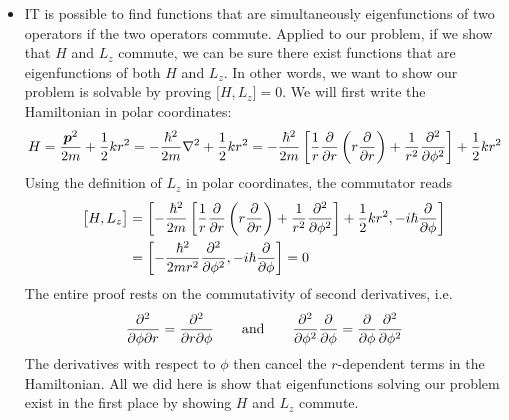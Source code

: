 \documentclass[11pt, a4paper]{article}
\newcommand{\eqtext}[1]{\qquad \text{#1} \qquad}
\renewcommand{\vec}[1]{\bm{#1}} %
\begin{document}
\begin{itemize}
	\item IT is possible to find functions that are simultaneously eigenfunctions of two operators if the two operators commute. Applied to our problem, if we show that $ H $ and $ L_{z} $ commute, we can be sure there exist functions that are eigenfunctions of both $ H $ and $ L_{z} $. In other words, we want to show our problem is solvable by proving $ \big[H, L_{z}\big] = 0 $. We will first write the Hamiltonian in polar coordinates:
	\begin{equation*}
		H = \frac{\vec{p}^{2}}{2m} + \frac{1}{2}kr^{2} = -\frac{\hbar^{2}}{2m} \laplacian + \frac{1}{2}kr^{2} = -\frac{\hbar^{2}}{2m}\left [\frac{1}{r}\pdv{r}\left(r\pdv{r}\right) + \frac{1}{r^{2}}\pdv[2]{}{\phi}\right ] + \frac{1}{2}kr^{2}
	\end{equation*}
	Using the definition of $ L_{z} $ in polar coordinates, the commutator reads
	\begin{align*}
		\big[H, L_{z}\big] &= \left[ -\frac{\hbar^{2}}{2m}\left [\frac{1}{r}\pdv{r}\left(r\pdv{r}\right) + \frac{1}{r^{2}}\pdv[2]{}{\phi}\right ] + \frac{1}{2}kr^{2}, -i\hbar \pdv{\phi}\right]\\
		&=\left[-\frac{\hbar^{2}}{2mr^{2}}\pdv[2]{}{\phi}, -i\hbar \pdv{\phi}\right] = 0
	\end{align*}
	The entire proof rests on the commutativity of second derivatives, i.e. 
	\begin{equation*}
		\pdv{}{\phi}{r} = \pdv{}{r}{\phi} \eqtext{and} \pdv[2]{}{\phi} \pdv{\phi} =  \pdv{\phi} \pdv[2]{}{\phi}
	\end{equation*} 
	The derivatives with respect to $ \phi $ then cancel the $ r $-dependent terms in the Hamiltonian. All we did here is show that eigenfunctions solving our problem exist in the first place by showing $ H $ and $ L_{z} $ commute.
	

\end{itemize}
\end{document}
